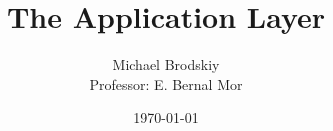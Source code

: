 


\title{The Application Layer}
\date{\today}
\author{Michael Brodskiy\\ \small Professor: E. Bernal Mor}



\maketitle

